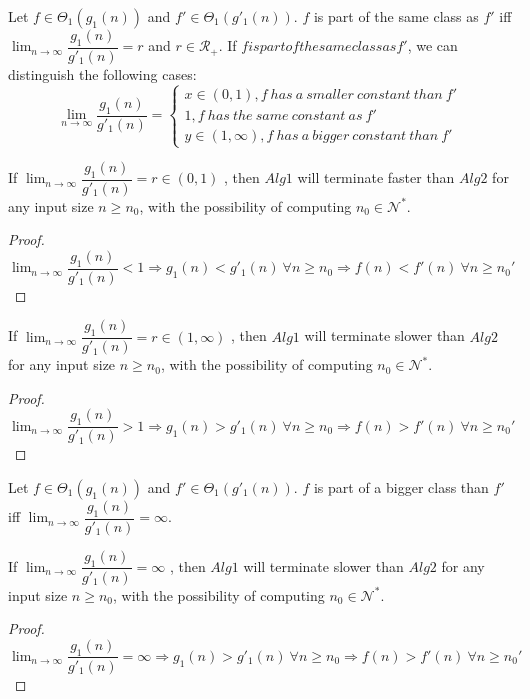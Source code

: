 \begin{definition}
Let $f \in \Theta_{1}(g_{1}(n))$ and $f' \in \Theta_{1}(g'_{1}(n))$. $f$ is part of the same class as $f'$ iff $\lim_{n\to\infty} \dfrac{g_{1}(n)}{g'_{1}(n)} = r$ and $r \in \mathcal{R}_{+}$.
If $f is part of the same class as f'$, we can distinguish the following cases:
$$
\lim_{n\to\infty} \dfrac{g_{1}(n)}{g'_{1}(n)} = 
\begin{cases}
x \in (0,1), f\ has\ a\ smaller\ constant\ than\ f' \\
1, f\ has\ the\ same\ constant\ as\ f'\\
y \in (1,\infty), f\ has\ a\ bigger\ constant\ than\ f'
\end{cases}
$$
\end{definition}

\begin{lemma}
If  $ \lim_{n\to\infty} \dfrac{g_{1}(n)}{g'_{1}(n)} = r \in (0,1) $ , then $Alg1$ will terminate faster than $Alg2$ for any input size $n \geq n_{0}$, with the possibility of computing $n_{0} \in \mathcal{N}^{*}$.
\end{lemma}
\begin{proof}
$\lim_{n\to\infty} \dfrac{g_{1}(n)}{g'_{1}(n)} < 1 \Rightarrow g_{1}(n) < g'_{1}(n)\ \forall n \geq n_{0} \Rightarrow f(n) < f'(n) \ \forall n \geq n_{0}'$
\end{proof}

\begin{lemma}
If  $ \lim_{n\to\infty} \dfrac{g_{1}(n)}{g'_{1}(n)} = r \in (1,\infty) $ , then $Alg1$ will terminate slower than $Alg2$ for any input size $n \geq n_{0}$, with the possibility of computing $n_{0} \in \mathcal{N}^{*}$.
\end{lemma}
\begin{proof}
$\lim_{n\to\infty} \dfrac{g_{1}(n)}{g'_{1}(n)} > 1 \Rightarrow g_{1}(n) > g'_{1}(n)\ \forall n \geq n_{0} \Rightarrow f(n) > f'(n) \ \forall n \geq n_{0}'$
\end{proof}



\begin{definition}
Let $f \in \Theta_{1}(g_{1}(n))$ and $f' \in \Theta_{1}(g'_{1}(n))$. $f$ is part of a bigger class than $f'$ iff $\lim_{n\to\infty} \dfrac{g_{1}(n)}{g'_{1}(n)} = \infty$.
\end{definition}
\begin{lemma}
If  $ \lim_{n\to\infty} \dfrac{g_{1}(n)}{g'_{1}(n)} = \infty $ , then $Alg1$ will terminate slower than $Alg2$ for any input size $n \geq n_{0}$, with the possibility of computing $n_{0} \in \mathcal{N}^{*}$.
\end{lemma}
\begin{proof}
$\lim_{n\to\infty} \dfrac{g_{1}(n)}{g'_{1}(n)} = \infty \Rightarrow g_{1}(n) > g'_{1}(n)\ \forall n \geq n_{0} \Rightarrow f(n) > f'(n) \ \forall n \geq n_{0}'$
\end{proof}


